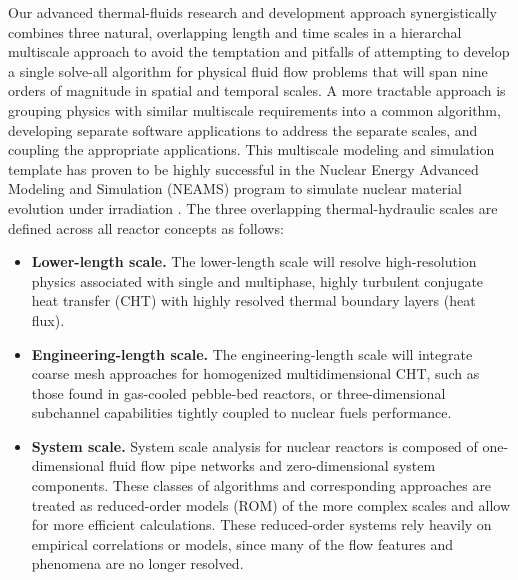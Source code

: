 Our advanced thermal-fluids research and development approach synergistically combines three natural, overlapping length and time scales in a hierarchal multiscale approach to avoid the temptation and
pitfalls of attempting to develop a single solve-all algorithm for physical fluid flow problems that will span nine orders of magnitude in spatial and temporal scales. A more tractable approach is grouping physics with similar multiscale requirements into a common algorithm, developing separate software applications to address the separate scales, and coupling the appropriate applications. This multiscale modeling and simulation template has proven to be highly successful in the Nuclear Energy Advanced Modeling and Simulation (NEAMS) program to simulate nuclear material evolution under irradiation \cite{tonks2013multiscale}. The three overlapping thermal-hydraulic scales are defined across all reactor concepts as follows:
\begin{itemize}
    \item \textbf{Lower-length scale.} The lower-length scale will resolve high-resolution physics
    associated with single and multiphase, highly turbulent conjugate heat transfer (CHT) with highly
    resolved thermal boundary layers (heat flux).
    \item \textbf{Engineering-length scale.} The engineering-length scale will integrate coarse mesh approaches
    for homogenized multidimensional CHT, such as those found in gas-cooled pebble-bed reactors, or three-dimensional subchannel capabilities tightly coupled to nuclear fuels performance.
    \item \textbf{System scale.} System scale analysis for nuclear reactors is composed of one-dimensional fluid flow
    pipe networks and zero-dimensional system components. These classes of algorithms and corresponding approaches are treated as reduced-order models (ROM) of the more complex scales and allow for more efficient calculations. These reduced-order systems rely heavily on empirical correlations or models, since many of the flow features and phenomena are no longer resolved.
\end{itemize}


